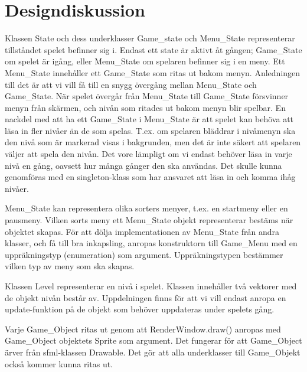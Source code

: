 \documentclass{TDP005mall}
\begin{document}
\section{Designdiskussion}%


Klassen State och dess underklasser Game\_state och Menu\_State representerar tillståndet spelet befinner sig i. Endast ett state är aktivt åt gången; Game\_State om spelet är igång, eller Menu\_State om spelaren befinner sig i en meny. Ett Menu\_State innehåller ett Game\_State som ritas ut bakom menyn. Anledningen till det är att vi vill få till en snygg övergång mellan Menu\_State och Game\_State. När spelet övergår från Menu\_State till Game\_State försvinner menyn från skärmen, och nivån som ritades ut bakom menyn blir spelbar. En nackdel med att ha ett Game\_State i Menu\_State är att spelet kan behöva att läsa in fler nivåer än de som spelas. T.ex. om spelaren bläddrar i nivåmenyn ska den nivå som är markerad visas i bakgrunden, men det är inte säkert att spelaren väljer att spela den nivån. Det vore lämpligt om vi endast behöver läsa in varje nivå en gång, oavsett hur många gånger den ska användas. Det skulle kunna genomföras med en singleton-klass som har ansvaret att läsa in och komma ihåg nivåer.

Menu\_State kan representera olika sorters menyer, t.ex. en startmeny eller en pausmeny. Vilken sorts meny ett Menu\_State objekt representerar bestäms när objektet skapas. För att dölja implementationen av Menu\_State från andra klasser, och få till bra inkapsling, anropas konstruktorn till Game\_Menu med en uppräkningstyp (enumeration) som argument. Uppräkningstypen bestämmer vilken typ av meny som ska skapas.

Klassen Level representerar en nivå i spelet. Klassen innehåller två vektorer med de objekt nivån består av. Uppdelningen finns för att vi vill endast anropa en update-funktion på de objekt som behöver uppdateras under spelets gång.

Varje Game\_Object ritas ut genom att RenderWindow.draw() anropas med Game\_Object objektets Sprite som argument. Det fungerar för att Game\_Object ärver från sfml-klassen Drawable. Det gör att alla underklasser till Game\_Objekt också kommer kunna ritas ut. 
\end{document}
